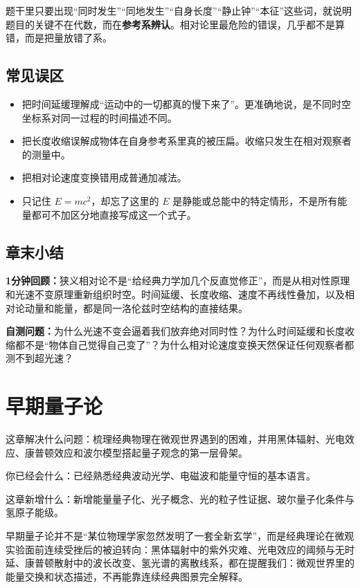 \documentclass[lang=cn,11pt]{elegantbook}
\newcommand{\bridge}[1]{\begin{note}#1\end{note}}
\newcommand{\chapterroadmap}[3]{%
\begin{introduction}
  \item {\heiti 这章解决什么问题：}#1
  \item {\heiti 你已经会什么：}#2
  \item {\heiti 这章新增什么：}#3
\end{introduction}}
\newcommand{\summaryline}[1]{\par\noindent\textbf{1分钟回顾：}#1\par}
\newcommand{\chapterselfcheck}[1]{\par\noindent\textbf{自测问题：}#1\par}
\begin{document}
\begin{remark}
题干里只要出现“同时发生”“同地发生”“自身长度”“静止钟”“本征”这些词，就说明题目的关键不在代数，而在\textbf{参考系辨认}。相对论里最危险的错误，几乎都不是算错，而是把量放错了系。
\end{remark}

\section{常见误区}

\begin{itemize}
  \item 把时间延缓理解成“运动中的一切都真的慢下来了”。更准确地说，是不同时空坐标系对同一过程的时间描述不同。
  \item 把长度收缩误解成物体在自身参考系里真的被压扁。收缩只发生在相对观察者的测量中。
  \item 把相对论速度变换错用成普通加减法。
  \item 只记住 \(E=mc^2\)，却忘了这里的 \(E\) 是静能或总能中的特定情形，不是所有能量都可不加区分地直接写成这一个式子。
\end{itemize}

\section{章末小结}

\summaryline{狭义相对论不是“给经典力学加几个反直觉修正”，而是从相对性原理和光速不变原理重新组织时空。时间延缓、长度收缩、速度不再线性叠加，以及相对论动量和能量，都是同一洛伦兹时空结构的直接结果。}
\chapterselfcheck{为什么光速不变会逼着我们放弃绝对同时性？为什么时间延缓和长度收缩都不是“物体自己觉得自己变了”？为什么相对论速度变换天然保证任何观察者都测不到超光速？}

\chapter{早期量子论}

\chapterroadmap
{梳理经典物理在微观世界遇到的困难，并用黑体辐射、光电效应、康普顿效应和波尔模型搭起量子观念的第一层骨架。}
{已经熟悉经典波动光学、电磁波和能量守恒的基本语言。}
{新增能量量子化、光子概念、光的粒子性证据、玻尔量子化条件与氢原子能级。}

\bridge{早期量子论并不是“某位物理学家忽然发明了一套全新玄学”，而是经典理论在微观实验面前连续受挫后的被迫转向：黑体辐射中的紫外灾难、光电效应的阈频与无时延、康普顿散射中的波长改变、氢光谱的离散线系，都在提醒我们：微观世界里的能量交换和状态描述，不再能靠连续经典图景完全解释。}
\end{document}
